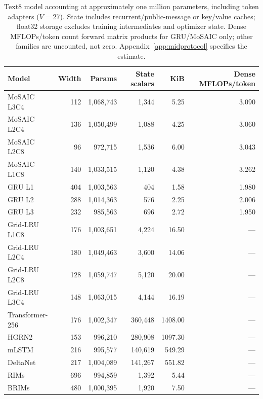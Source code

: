 \begin{table}[H]
\centering
\caption{Text8 model accounting at approximately one million parameters, including token adapters ($V=27$). State includes recurrent/public-message or key/value caches; float32 storage excludes training intermediates and optimizer state. Dense MFLOPs/token count forward matrix products for GRU/MoSAIC only; other families are uncounted, not zero. Appendix~\ref{app:midprotocol} specifies the estimate.}
\label{tab:midstate}
\begin{tabular}{lrrrrr}
\toprule
Model & Width & Params & State scalars & KiB & Dense MFLOPs/token \\
\midrule
MoSAIC L3C4 & 112 & 1,068,743 & 1,344 & 5.25 & 3.090 \\
MoSAIC L2C4 & 136 & 1,050,499 & 1,088 & 4.25 & 3.060 \\
MoSAIC L2C8 & 96 & 972,715 & 1,536 & 6.00 & 3.043 \\
MoSAIC L1C8 & 140 & 1,033,515 & 1,120 & 4.38 & 3.262 \\
GRU L1 & 404 & 1,003,563 & 404 & 1.58 & 1.980 \\
GRU L2 & 288 & 1,014,363 & 576 & 2.25 & 2.006 \\
GRU L3 & 232 & 985,563 & 696 & 2.72 & 1.950 \\
Grid-LRU L1C8 & 176 & 1,003,651 & 4,224 & 16.50 & --- \\
Grid-LRU L2C4 & 180 & 1,049,463 & 3,600 & 14.06 & --- \\
Grid-LRU L2C8 & 128 & 1,059,747 & 5,120 & 20.00 & --- \\
Grid-LRU L3C4 & 148 & 1,063,015 & 4,144 & 16.19 & --- \\
Transformer-256 & 176 & 1,002,347 & 360,448 & 1408.00 & --- \\
HGRN2 & 153 & 996,210 & 280,908 & 1097.30 & --- \\
mLSTM & 216 & 995,577 & 140,619 & 549.29 & --- \\
DeltaNet & 217 & 1,004,089 & 141,267 & 551.82 & --- \\
RIMs & 696 & 994,859 & 1,392 & 5.44 & --- \\
BRIMs & 480 & 1,000,395 & 1,920 & 7.50 & --- \\
\bottomrule
\end{tabular}
\end{table}
